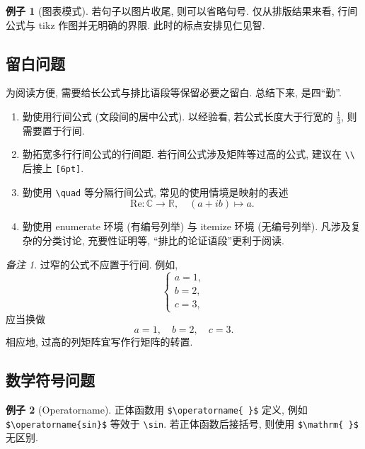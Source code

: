 \documentclass[11pt]{ctexart}
\theoremstyle{definition}
\numberwithin{equation}{section}
\theoremstyle{definition}
\newtheorem*{example}{例子}
\theoremstyle{remark}
\newtheorem*{remark}{备注}
\begin{document}
\begin{example}[图表模式]
    若句子以图片收尾, 则可以省略句号. 仅从排版结果来看, 行间公式与 tikz 作图并无明确的界限. 此时的标点安排见仁见智. 
\end{example}

\subsection{留白问题}

为阅读方便, 需要给长公式与排比语段等保留必要之留白. 总结下来, 是四``勤''. 
\begin{enumerate}
    \item 勤使用行间公式 (文段间的居中公式). 以经验看, 若公式长度大于行宽的 $\frac 13$, 则需要置于行间. 
    \item 勤拓宽多行行间公式的行间距. 若行间公式涉及矩阵等过高的公式, 建议在 \verb|\\| 后接上 \verb|[6pt]|. 
    \item 勤使用 \verb|\quad| 等分隔行间公式, 常见的使用情境是映射的表述
    \begin{equation}
        \mathrm{Re}:\mathbb C\to \mathbb R,\quad (a+ib)\mapsto a. 
    \end{equation}
    \item 勤使用 enumerate 环境 (有编号列举) 与 itemize 环境 (无编号列举). 凡涉及复杂的分类讨论, 充要性证明等, ``排比的论证语段''更利于阅读. 
\end{enumerate}

\begin{remark}
    过窄的公式不应置于行间. 例如,
\begin{equation}
    \begin{cases}
        a=1,\\b=2,\\c=3,
    \end{cases}
\end{equation}
应当换做 
\begin{equation}
    a=1,\quad b=2,\quad c=3. 
\end{equation}
相应地, 过高的列矩阵宜写作行矩阵的转置. 
\end{remark}

\subsection{数学符号问题}

\begin{example}[Operatorname]
    正体函数用 \verb|$\operatorname{ }$| 定义, 例如 \verb|$\operatorname{sin}$| 等效于 \verb|\sin|. 若正体函数后接括号, 则使用 \verb|$\mathrm{ }$| 无区别. 
\end{example}
\end{document}

